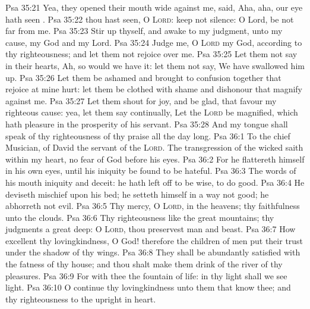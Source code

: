 \vs Psa 35:21 Yea, they opened their mouth wide against me,  said, Aha, aha, our eye hath seen .
\vs Psa 35:22  thou hast seen, O \textsc{Lord}: keep not silence: O Lord, be not far from me.
\vs Psa 35:23 Stir up thyself, and awake to my judgment,  unto my cause, my God and my Lord.
\vs Psa 35:24 Judge me, O \textsc{Lord} my God, according to thy righteousness; and let them not rejoice over me.
\vs Psa 35:25 Let them not say in their hearts, Ah, so would we have it: let them not say, We have swallowed him up.
\vs Psa 35:26 Let them be ashamed and brought to confusion together that rejoice at mine hurt: let them be clothed with shame and dishonour that magnify  against me.
\vs Psa 35:27 Let them shout for joy, and be glad, that favour my righteous cause: yea, let them say continually, Let the \textsc{Lord} be magnified, which hath pleasure in the prosperity of his servant.
\vs Psa 35:28 And my tongue shall speak of thy righteousness  of thy praise all the day long.
\vs Psa 36:1 To the chief Musician,  of David the servant of the \textsc{Lord}. The transgression of the wicked saith within my heart,  no fear of God before his eyes.
\vs Psa 36:2 For he flattereth himself in his own eyes, until his iniquity be found to be hateful.
\vs Psa 36:3 The words of his mouth  iniquity and deceit: he hath left off to be wise,  to do good.
\vs Psa 36:4 He deviseth mischief upon his bed; he setteth himself in a way  not good; he abhorreth not evil.
\vs Psa 36:5 Thy mercy, O \textsc{Lord},  in the heavens;  thy faithfulness  unto the clouds.
\vs Psa 36:6 Thy righteousness  like the great mountains; thy judgments  a great deep: O \textsc{Lord}, thou preservest man and beast.
\vs Psa 36:7 How excellent  thy lovingkindness, O God! therefore the children of men put their trust under the shadow of thy wings.
\vs Psa 36:8 They shall be abundantly satisfied with the fatness of thy house; and thou shalt make them drink of the river of thy pleasures.
\vs Psa 36:9 For with thee  the fountain of life: in thy light shall we see light.
\vs Psa 36:10 O continue thy lovingkindness unto them that know thee; and thy righteousness to the upright in heart.
